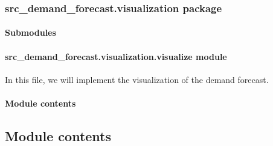 \documentclass[letterpaper,10pt,english]{sphinxmanual}
\begin{document}
\subsubsection{src\_demand\_forecast.visualization package}
\label{\detokenize{src_demand_forecast.visualization:src-demand-forecast-visualization-package}}\label{\detokenize{src_demand_forecast.visualization::doc}}

\paragraph{Submodules}
\label{\detokenize{src_demand_forecast.visualization:submodules}}

\paragraph{src\_demand\_forecast.visualization.visualize module}
\label{\detokenize{src_demand_forecast.visualization:module-src_demand_forecast.visualization.visualize}}\label{\detokenize{src_demand_forecast.visualization:src-demand-forecast-visualization-visualize-module}}
\sphinxAtStartPar
In this file, we will implement the visualization of the demand forecast.


\paragraph{Module contents}
\label{\detokenize{src_demand_forecast.visualization:module-src_demand_forecast.visualization}}\label{\detokenize{src_demand_forecast.visualization:module-contents}}

\subsection{Module contents}
\label{\detokenize{src_demand_forecast:module-src_demand_forecast}}\label{\detokenize{src_demand_forecast:module-contents}}
\end{document}
